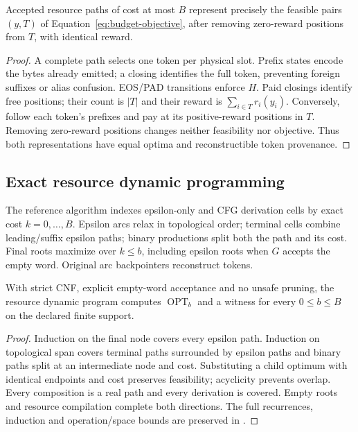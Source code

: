 \begin{lemma}
Accepted resource paths of cost at most $B$ represent precisely the feasible pairs $(y,T)$ of Equation~\ref{eq:budget-objective}, after removing zero-reward positions from $T$, with identical reward.
\end{lemma}
\begin{proof}
A complete path selects one token per physical slot. Prefix states encode the bytes already emitted; a closing identifies the full token, preventing foreign suffixes or alias confusion. EOS/PAD transitions enforce $H$. Paid closings identify free positions; their count is $|T|$ and their reward is $\sum_{i\in T}r_i(y_i)$. Conversely, follow each token's prefixes and pay at its positive-reward positions in $T$. Removing zero-reward positions changes neither feasibility nor objective. Thus both representations have equal optima and reconstructible token provenance.
\end{proof}

\subsection{Exact resource dynamic programming}

The reference algorithm indexes epsilon-only and CFG derivation cells by exact
cost $k=0,\ldots,B$. Epsilon arcs relax in topological order; terminal cells
combine leading/suffix epsilon paths; binary productions split both the path
and its cost. Final roots maximize over $k\leq b$, including epsilon roots when
$G$ accepts the empty word. Original arc backpointers reconstruct tokens.

\begin{theorem}
With strict CNF, explicit empty-word acceptance and no unsafe pruning, the
resource dynamic program computes $\operatorname{OPT}_b$ and a witness for every
$0\leq b\leq B$ on the declared finite support.
\label{thm:budget-dp}
\end{theorem}
\begin{proof}
Induction on the final node covers every epsilon path. Induction on topological
span covers terminal paths surrounded by epsilon paths and binary paths split
at an intermediate node and cost. Substituting a child optimum with identical
endpoints and cost preserves feasibility; acyclicity prevents overlap. Every
composition is a real path and every derivation is covered. Empty roots and
resource compilation complete both directions. The full recurrences, induction
and operation/space bounds are preserved in
.
\end{proof}

